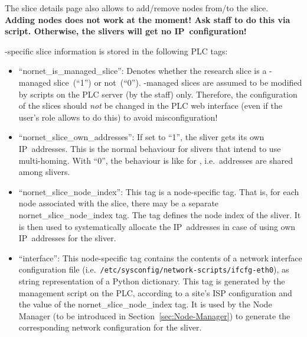 The slice details page also allows to add/remove nodes from/to the slice.
\\
\textbf{Adding nodes does not work at the moment! Ask  staff to do this via script. Otherwise, the slivers will get no IP~configuration!}

-specific slice information is stored in the following PLC tags:
\begin{itemize}
 \item ``nornet\_is\_managed\_slice'': Denotes whether the research slice is a -managed slice~(``1'') or not~(``0''). -managed slices are assumed to be modified by scripts on the PLC server (by the  staff) only. Therefore, the configuration of the slices should \emph{not} be changed in the PLC web interface (even if the user's role allows to do this) to avoid misconfiguration!

 \item ``nornet\_slice\_own\_addresses'': If set to ``1'', the sliver gets its own IP~addresses. This is the normal behaviour for  slivers that intend to use multi-homing. With ``0'', the behaviour is like for , i.e.\ addresses are shared among slivers.

 \item ``nornet\_slice\_node\_index'': This tag is a node-specific tag. That is, for each node associated with the slice, there may be a separate nornet\_slice\_node\_index tag. The tag defines the node index of the sliver. It is then used to systematically allocate the IP~addresses in case of using own IP~addresses for the sliver.
 
 \item ``interface'': This node-specific tag contains the contents of a  network interface configuration file (i.e.\ \texttt{/etc/sysconfig/network-scripts/ifcfg-eth0}), as string representation of a Python dictionary. This tag is generated by the management script on the PLC, according to a site's ISP configuration and the value of the nornet\_slice\_node\_index tag. It is used by the Node Manager (to be introduced in Section~\ref{sec:Node-Manager}) to generate the corresponding network configuration for the sliver.
\end{itemize}

